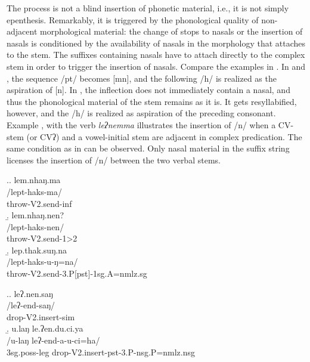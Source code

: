 The process is not a blind insertion of phonetic material, i.e., it is not simply epenthesis. Remarkably, it is triggered by the phonological quality of non-adjacent morphological material: the change of stops to nasals or the insertion of nasals is conditioned by the availability of nasals in the morphology that attaches to the stem. The suffixes containing nasals have to attach directly to the complex stem in order to trigger the insertion of nasals. Compare the examples in \Next. In \Next[a] and \Next[b], the sequence /pt/ becomes [mn], and the following /h/ is realized  as the aspiration of [n]. In \Next[c], the inflection does not immediately contain a nasal, and thus the phonological material of the stem remains as it is. It gets resyllabified, however, and the /h/ is realized as aspiration of the preceding consonant. Example \NNext, with the verb \emph{leʔnemma}  illustrates the insertion of /n/ when a CV-stem (or CVʔ) and a vowel-initial stem are adjacent in complex predication. The same condition as in \Next can be observed. Only nasal material in the suffix string licenses the insertion of /n/ between the two verbal stems. 


\ex.\a. \glll lem.nhaŋ.ma\\
/lept-haks-ma/\\
throw{\sc -V2.send-inf}\\
\b. \glll lem.nhaŋ.nen?\\
/lept-haks-nen/\\
throw{\sc -V2.send-1>2}\\
\b. \glll lep.thak.suŋ.na\\
/lept-haks-u-ŋ=na/\\
throw{\sc -V2.send-3.P[pst]-1sg.A=nmlz.sg}\\

\ex.\a. \glll leʔ.nen.saŋ\\
/leʔ-end-saŋ/\\
drop{\sc -V2.insert-sim}\\
\b. \glll u.laŋ le.ʔen.du.ci.ya\\
/u-laŋ leʔ-end-a-u-ci=ha/\\
{\sc 3sg.poss-}leg drop{\sc -V2.insert-pst-3.P-nsg.P=nmlz.nsg}\\



